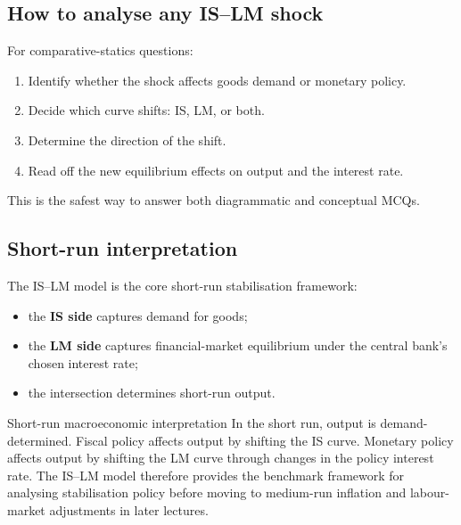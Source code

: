 \subsection{How to analyse any IS--LM shock}

\begin{examtip}[title={Exam Focus: Standard 4-step method}]
For comparative-statics questions:
\begin{enumerate}[leftmargin=1.5em]
\item Identify whether the shock affects goods demand or monetary policy.
\item Decide which curve shifts: IS, LM, or both.
\item Determine the direction of the shift.
\item Read off the new equilibrium effects on output and the interest rate.
\end{enumerate}
This is the safest way to answer both diagrammatic and conceptual MCQs.
\end{examtip}

\subsection{Short-run interpretation}

The IS--LM model is the core short-run stabilisation framework:
\begin{itemize}[leftmargin=1.5em]
\item the \textbf{IS side} captures demand for goods;
\item the \textbf{LM side} captures financial-market equilibrium under the central bank's chosen interest rate;
\item the intersection determines short-run output.
\end{itemize}

\begin{theorem}{Short-run macroeconomic interpretation}{}
In the short run, output is demand-determined. Fiscal policy affects output by shifting the IS curve. Monetary policy affects output by shifting the LM curve through changes in the policy interest rate. The IS--LM model therefore provides the benchmark framework for analysing stabilisation policy before moving to medium-run inflation and labour-market adjustments in later lectures.
\end{theorem}
